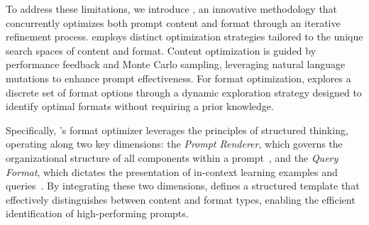 To address these limitations, we introduce \textbf{\fullsysname{}}, an innovative methodology that concurrently optimizes both prompt content and format through an iterative refinement process. \sysname{} employs distinct optimization strategies tailored to the unique search spaces of content and format. Content optimization is guided by performance feedback and Monte Carlo sampling, leveraging natural language mutations to enhance prompt effectiveness. For format optimization, \sysname{} explores a discrete set of format options through a dynamic exploration strategy designed to identify optimal formats without requiring a prior knowledge.

Specifically, \sysname{}'s format optimizer leverages the principles of structured thinking, operating along two key dimensions: the \textit{Prompt Renderer}, which governs the organizational structure of all components within a prompt~\citep{he2024doespromptformattingimpact}, and the \textit{Query Format}, which dictates the presentation of in-context learning examples and queries~\citep{voronov2024mindformatconsistentevaluation,salinas2024butterflyeffectalteringprompts}. By integrating these two dimensions, \sysname{} defines a structured template that effectively distinguishes between content and format types, enabling the efficient identification of high-performing prompts.


